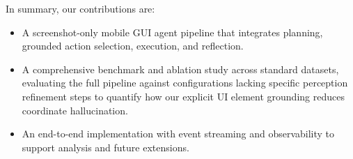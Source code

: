 In summary, our contributions are:
\begin{itemize}
	\item A screenshot-only mobile GUI agent pipeline that integrates planning, grounded action selection, execution, and reflection.
	\item A comprehensive benchmark and ablation study across standard datasets, evaluating the full pipeline against configurations lacking specific perception refinement steps to quantify how our explicit UI element grounding reduces coordinate hallucination.
	\item An end-to-end implementation with event streaming and observability to support analysis and future extensions.
\end{itemize}